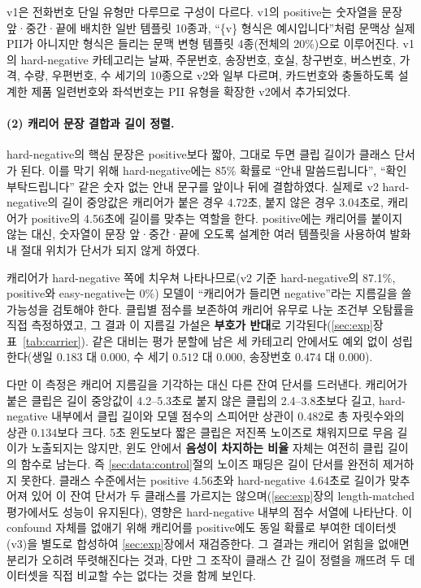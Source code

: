 \documentclass[11pt]{article}
\renewcommand{\emph}[1]{\textbf{#1}}
\begin{document}
v1은 전화번호 단일 유형만 다루므로 구성이 다르다. v1의 positive는 숫자열을 문장 앞·중간·끝에
배치한 일반 템플릿 10종과, ``{\{}v{\}} 형식은 예시입니다''처럼 문맥상 실제 PII가 아니지만
형식은 들리는 문맥 변형 템플릿 4종(전체의 20\%)으로 이루어진다. v1의 hard-negative
카테고리는 날짜, 주문번호, 송장번호, 호실, 창구번호, 버스번호, 가격, 수량, 우편번호, 수
세기의 10종으로 v2와 일부 다르며, 카드번호와 충돌하도록 설계한 제품 일련번호와 좌석번호는
PII 유형을 확장한 v2에서 추가되었다.

\paragraph{(2) 캐리어 문장 결합과 길이 정렬.}
hard-negative의 핵심 문장은 positive보다 짧아, 그대로 두면 클립 길이가 클래스 단서가 된다.
이를 막기 위해 hard-negative에는 85\% 확률로 ``안내 말씀드립니다'', ``확인 부탁드립니다''
같은 숫자 없는 안내 문구를 앞이나 뒤에 결합하였다. 실제로 v2 hard-negative의 길이 중앙값은
캐리어가 붙은 경우 4.72초, 붙지 않은 경우 3.04초로, 캐리어가 positive의 4.56초에 길이를
맞추는 역할을 한다. positive에는 캐리어를 붙이지 않는 대신, 숫자열이 문장 앞·중간·끝에
오도록 설계한 여러 템플릿을 사용하여 발화 내 절대 위치가 단서가 되지 않게 하였다.

캐리어가 hard-negative 쪽에 치우쳐 나타나므로(v2 기준 hard-negative의 87.1\%, positive와
easy-negative는 0\%) 모델이 ``캐리어가 들리면 negative''라는 지름길을 쓸 가능성을 검토해야
한다. 클립별 점수를 보존하여 캐리어 유무로 나눈 조건부 오탐률을 직접 측정하였고, 그 결과
이 지름길 가설은 \emph{부호가 반대}로 기각된다(\ref{sec:exp}장 표~\ref{tab:carrier}).
같은 대비는 평가 분할에 남은 세 카테고리 안에서도 예외 없이 성립한다(생일 $0.183$ 대
$0.000$, 수 세기 $0.512$ 대 $0.000$, 송장번호 $0.474$ 대 $0.000$).

다만 이 측정은 캐리어 지름길을 기각하는 대신 다른 잔여 단서를 드러낸다. 캐리어가 붙은 클립은
길이 중앙값이 4.2--5.3초로 붙지 않은 클립의 2.4--3.8초보다 길고, hard-negative 내부에서 클립
길이와 모델 점수의 스피어만 상관이 $0.482$로 총 자릿수와의 상관 $0.134$보다 크다. 5초 윈도보다
짧은 클립은 저진폭 노이즈로 채워지므로 무음 길이가 노출되지는 않지만, 윈도 안에서 \emph{음성이
차지하는 비율} 자체는 여전히 클립 길이의 함수로 남는다. 즉 \ref{sec:data:control}절의 노이즈
패딩은 길이 단서를 완전히 제거하지 못한다. 클래스 수준에서는 positive 4.56초와 hard-negative
4.64초로 길이가 맞추어져 있어 이 잔여 단서가 두 클래스를 가르지는 않으며(\ref{sec:exp}장의
length-matched 평가에서도 성능이 유지된다), 영향은 hard-negative 내부의 점수 서열에 나타난다.
이 confound 자체를 없애기 위해 캐리어를 positive에도 동일 확률로 부여한 데이터셋(v3)을
별도로 합성하여 \ref{sec:exp}장에서 재검증한다. 그 결과는 캐리어 얽힘을 없애면 분리가 오히려
뚜렷해진다는 것과, 다만 그 조작이 클래스 간 길이 정렬을 깨뜨려 두 데이터셋을 직접 비교할 수는
없다는 것을 함께 보인다.
\end{document}
